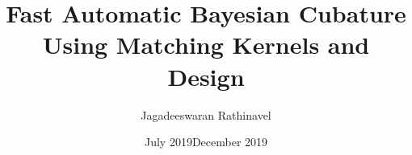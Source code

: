 \documentclass{iitthesis}          %
\begin{document}
\setlength\abovedisplayskip{0pt}
\setlength{\belowdisplayskip}{0pt}

\title{Fast Automatic Bayesian Cubature Using Matching Kernels and Design
}
%



\author{Jagadeeswaran Rathinavel       %
}

\date{July 2019}


\date{December 2019}

\maketitle


\prelimpages         %
\end{document}
